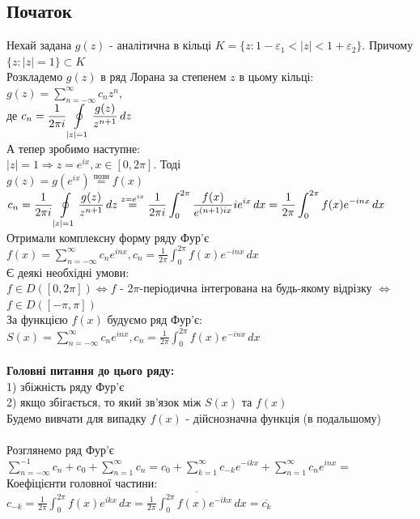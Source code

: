 \documentclass[a4paper, 10pt]{article}
\def\hugespace{\vspace{5mm} \\}
\theoremstyle{theoremdd}
\theoremstyle{theoremdd}
\theoremstyle{theoremdd}
\theoremstyle{theoremdd}
\theoremstyle{theoremdd}
\theoremstyle{theoremdd}
\theoremstyle{theoremdd}
\theoremstyle{theoremdd}
\begin{document}
\subsection{Початок}
Нехай задана $g(z)$ - аналітична в кільці $K = \{z: 1-\varepsilon_1 <|z|<1+\varepsilon_2 \}$. Причому $\{z: |z|=1\} \subset K$\\
Розкладемо $g(z)$ в ряд Лорана за степенем $z$ в цьому кільці:\\
$\displaystyle g(z) = \sum_{n=-\infty}^{\infty} c_n z^n$,\\
де $\displaystyle c_n = \frac{1}{2 \pi i} \oint\displaylimits_{|z|=1} \frac{g(z)}{z^{n+1}}\,dz$\\
А тепер зробимо наступне:\\
$|z|=1 \Rightarrow z = e^{ix}, x \in [0, 2 \pi]$. Тоді\\
$\displaystyle g(z) = g(e^{ix}) \overset{\textrm{позн}}{=} f(x)$\\
$\displaystyle c_n = \frac{1}{2 \pi i} \oint\displaylimits_{|z|=1} \frac{g(z)}{z^{n+1}}\,dz \overset{z=e^{ix}}{=}  \frac{1}{2 \pi i} \int_0^{2 \pi} \frac{f(x)}{e^{(n+1)ix}} ie^{ix}\,dx = \frac{1}{2 \pi} \int_0^{2 \pi} f(x)e^{-inx}\,dx$\\
Отримали комплексну форму ряду Фур'є\\
$\displaystyle f(x) = \sum_{n=-\infty}^{\infty} c_n e^{inx}, c_n = \frac{1}{2 \pi} \int_0^{2 \pi} f(x)e^{-inx}\,dx$
\hugespace
Є деякі необхідні умови:\\
$f \in D([0, 2\pi]) \iff f$ - $2 \pi$-періодична інтегрована на будь-якому відрізку $\iff$ $f \in D([-\pi, \pi])$\\
За функцією $f(x)$ будуємо ряд Фур'є:\\
$\displaystyle S(x) = \sum_{n=-\infty}^{\infty} c_n e^{inx}, c_n = \frac{1}{2 \pi} \int_0^{2 \pi} f(x)e^{-inx}\,dx$\\
\hugespace
\textbf{Головні питання до цього ряду:}\\
1) збіжність ряду Фур'є\\
2) якщо збігається, то який зв'язок між $S(x)$ та $f(x)$\\
Будемо вивчати для випадку $f(x)$ - дійснозначна функція (в подальшому)\\
\hugespace
Розглянемо ряд Фур'є\\
$\displaystyle \sum_{n=-\infty}^{-1} c_n + c_0 + \displaystyle \sum_{n=1}^{\infty} c_n
= c_0 + \displaystyle \sum_{k=1}^{\infty} c_{-k}e^{-ikx} + \sum_{n=1}^{\infty} c_ne^{inx} \boxed{=}
$\\
Коефіцієнти головної частини: \\ $\displaystyle c_{-k} = \frac{1}{2 \pi} \int_0^{2\pi} f(x)e^{ikx} \,dx = \overline{\frac{1}{2 \pi} \int_0^{2\pi} f(x)e^{-ikx} \,dx} = \overline{c_k}$\\
\end{document}
